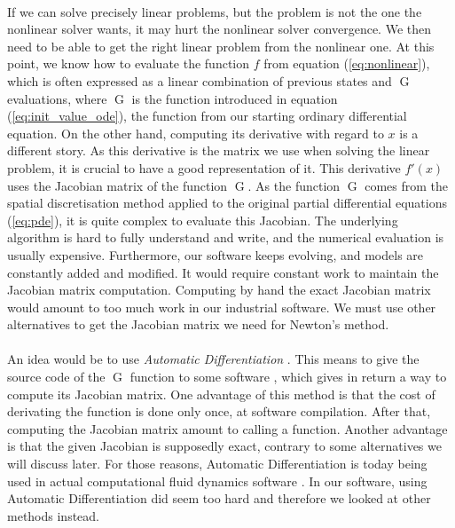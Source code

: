       \paragraph{}
      If we can solve precisely linear problems, but the problem is not the one the nonlinear solver wants, it may hurt the nonlinear solver convergence.
      We then need to be able to get the right linear problem from the nonlinear one.
      At this point, we know how to evaluate the function $f$ from equation (\ref{eq:nonlinear}), which is often expressed as a linear combination of previous states and $\operatorname{G}$ evaluations, where $\operatorname{G}$ is the function introduced in equation (\ref{eq:init_value_ode}), the function from our starting ordinary differential equation.
      On the other hand, computing its derivative with regard to $x$ is a different story.
      As this derivative is the matrix we use when solving the linear problem, it is crucial to have a good representation of it.
      This derivative $f'\left(x\right)$ uses the Jacobian matrix of the function $\operatorname{G}$.
      As the function $\operatorname{G}$ comes from the spatial discretisation method applied to the original partial differential equations (\ref{eq:pde}), it is quite complex to evaluate this Jacobian.
      The underlying algorithm is hard to fully understand and write, and the numerical evaluation is usually expensive.
      Furthermore, our software keeps evolving, and models are constantly added and modified.
      It would require constant work to maintain the Jacobian matrix computation.
      Computing by hand the exact Jacobian matrix would amount to too much work in our industrial software.
      We must use other alternatives to get the Jacobian matrix we need for Newton's method.

      \paragraph{}
      An idea would be to use \emph{Automatic Differentiation} \cite{Griewank2000}.
      This means to give the source code of the $\operatorname{G}$ function to some software \cite{HascoeetPascual2012}, which gives in return a way to compute its Jacobian matrix.
      One advantage of this method is that the cost of derivating the function is done only once, at software compilation.
      After that, computing the Jacobian matrix amount to calling a function.
      Another advantage is that the given Jacobian is supposedly exact, contrary to some alternatives we will discuss later.
      For those reasons, Automatic Differentiation is today being used in actual computational fluid dynamics software \cite{BilanceriBeuxElmahiEtAl2011, KenwayMaderHeEtAl2019}.
      In our software, using Automatic Differentiation did seem too hard and therefore we looked at other methods instead.

